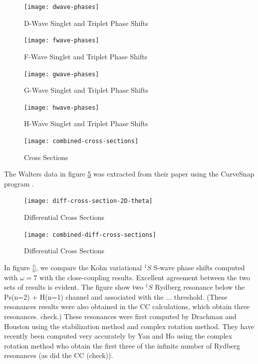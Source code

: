 \documentclass[preprint,showpacs,preprintnumbers,amsmath,amssymb]{revtex4}
\begin{document}
\begin{figure}[ht]
	\centering
	\texttt{[image: dwave-phases]}
	\caption{D-Wave Singlet and Triplet Phase Shifts}
	\label{fig:dwave-phases}
\end{figure}


\begin{figure}[ht]
	\centering
	\texttt{[image: fwave-phases]}
	\caption{F-Wave Singlet and Triplet Phase Shifts}
	\label{fig:fwave-phases}
\end{figure}


\begin{figure}[ht]
	\centering
	\texttt{[image: gwave-phases]}
	\caption{G-Wave Singlet and Triplet Phase Shifts}
	\label{fig:gwave-phases}
\end{figure}

\begin{figure}[ht]
	\centering
	\texttt{[image: hwave-phases]}
	\caption{H-Wave Singlet and Triplet Phase Shifts}
	\label{fig:hwave-phases}
\end{figure}


\begin{figure}[ht]
	\centering
	\texttt{[image: combined-cross-sections]}
	\caption{Cross Sections}
	\label{fig:combined-cross-sections}
\end{figure}

The Walters data \cite{Walters2004} in figure \ref{fig:combined-cross-sections} was extracted from their paper using the CurveSnap program \cite{CurveSnap}.

\begin{figure}[ht]
	\centering
	\texttt{[image: diff-cross-section-2D-theta]}
	\caption{Differential Cross Sections}
	\label{fig:diff-cross-section-2D-theta}
\end{figure}

\begin{figure}[ht]
	\centering
	\texttt{[image: combined-diff-cross-sections]}
	\caption{Differential Cross Sections}
	\label{fig:combined-diff-cross-sections}
\end{figure}




In figure \ref{}, we compare the Kohn variational
$^1S$ S-wave phase shifts computed with $\omega = 7$
with the close-coupling results.
Excellent agreement between the
two sets of results is evident.
The figure show two $^1S$ Rydberg resonance below the
Ps(n=2) + H(n=1) channel
and associated
with the ... threshold.
(These resonances results were also obtained in the CC calculations,
which obtain three resonances. check.)
These resonances were first computed by
Drachman and Houston using the stabilization
method and complex rotation method.
They have recently been computed very accurately
by Yan and Ho
using the complex rotation method who
obtain the first three of the infinite
number of Rydberg resonances (as did the CC (check)).
\end{document}
